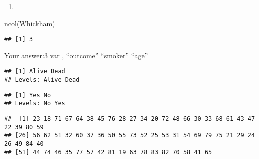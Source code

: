 \documentclass[
]{article}
\newenvironment{Shaded}{\begin{snugshade}}{\end{snugshade}}
\newcommand{\FunctionTok}[1]{\textcolor[rgb]{0.00,0.00,0.00}{#1}}
\newcommand{\NormalTok}[1]{#1}
\newcommand{\SpecialCharTok}[1]{\textcolor[rgb]{0.00,0.00,0.00}{#1}}
\providecommand{\tightlist}{%
  \setlength{\itemsep}{0pt}\setlength{\parskip}{0pt}}
\begin{document}
\begin{enumerate}
\def\labelenumi{\arabic{enumi}.}
\setcounter{enumi}{2}
\tightlist
\item
\end{enumerate}

\begin{Shaded}
\begin{Highlighting}[]
\FunctionTok{ncol}\NormalTok{(Whickham)}
\end{Highlighting}
\end{Shaded}

\begin{verbatim}
## [1] 3
\end{verbatim}

Your answer:3 var , ``outcome'' ``smoker'' ``age''

\begin{Shaded}
\end{Shaded}

\begin{verbatim}
## [1] Alive Dead 
## Levels: Alive Dead
\end{verbatim}

\begin{Shaded}
\end{Shaded}

\begin{verbatim}
## [1] Yes No 
## Levels: No Yes
\end{verbatim}

\begin{Shaded}
\end{Shaded}

\begin{verbatim}
##  [1] 23 18 71 67 64 38 45 76 28 27 34 20 72 48 66 30 33 68 61 43 47 22 39 80 59
## [26] 56 62 51 32 60 37 36 50 55 73 52 25 53 31 54 69 79 75 21 29 24 26 49 84 40
## [51] 44 74 46 35 77 57 42 81 19 63 78 83 82 70 58 41 65
\end{verbatim}
\end{document}
